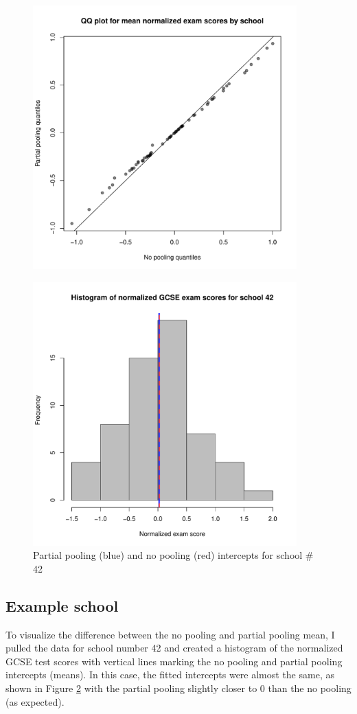 \documentclass{article}
\begin{document}
\begin{figure}[H]
\centering
\includegraphics[width = 4in]{figures/no_vs_partial.pdf}
\caption{}
\label{QQ}
\end{figure}

\begin{figure}[H]
\centering
\includegraphics[width = 4in]{figures/42.pdf}
\caption{Partial pooling (blue) and no pooling (red) intercepts for school \# 42}
\label{42}
\end{figure}

\subsection{Example school}
To visualize the difference between the no pooling and partial pooling mean, I pulled the data for school number 42 and created a histogram of the normalized GCSE test scores with vertical lines marking the no pooling and partial pooling intercepts (means). In this case, the fitted intercepts were almost the same, as shown in Figure \ref{42} with the partial pooling slightly closer to 0 than the no pooling (as expected).
\end{document}
